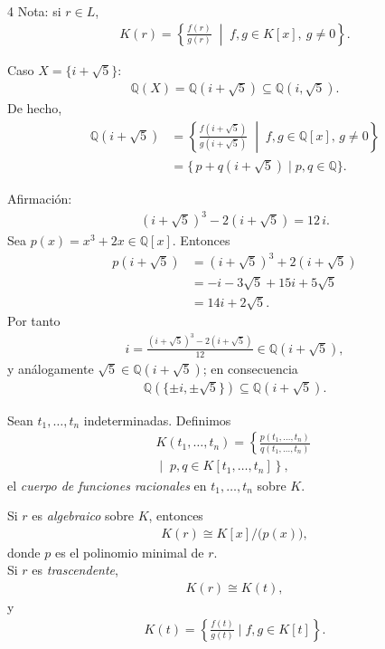 \documentclass[landscape,a4paper]{article}
\begin{document}
\begin{multicols}{4}
Nota: si $r\in L$,
\begin{align*}
  K(r)=\left\{\frac{f(r)}{g(r)} \;\middle|\; f,g\in K[x],\ g\neq 0\right\}.
\end{align*}

Caso $X=\{i+\sqrt{5}\}$:
\begin{align*}
\mathbb{Q}(X)=\mathbb{Q}(i+\sqrt{5})\subseteq\mathbb{Q}(i,\sqrt{5}).
\end{align*}
De hecho,
\begin{align*}
\mathbb{Q}(i+\sqrt{5})&=\left\{\frac{f(i+\sqrt{5})}{g(i+\sqrt{5})}\;\middle|\;f,g\in\mathbb{Q}[x],\,g\neq 0\right\}\\
                      &=\{\,p+q(i+\sqrt{5})\mid p,q\in\mathbb{Q}\}.
\end{align*}

Afirmación:
\begin{align*}
  (i+\sqrt{5})^{3}-2(i+\sqrt{5})=12\,i.
\end{align*}
Sea \(p(x)=x^{3}+2x\in\mathbb{Q}[x]\).  Entonces
\begin{align*}
  p(i+\sqrt{5})&=(i+\sqrt{5})^{3}+2(i+\sqrt{5})\\
               &=-i-3\sqrt{5}+15i+5\sqrt{5}\\
               &=14i+2\sqrt{5}.
\end{align*}
Por tanto
\begin{align*}
 i=\frac{(i+\sqrt{5})^{3}-2(i+\sqrt{5})}{12}\in\mathbb{Q}(i+\sqrt{5}),
\end{align*}
y análogamente \(\sqrt{5}\in\mathbb{Q}(i+\sqrt{5})\); en consecuencia
\begin{align*}
  \mathbb Q(\{\pm i,\pm\sqrt{5}\})\subseteq\mathbb{Q}(i+\sqrt{5}).
\end{align*}
\begin{tcolorbox}[colback=white,colframe=blue!80!black,colbacktitle=blue!80!black,
                  coltitle=white,title={Definición}]
Sean $t_1,\dots,t_n$ indeterminadas. Definimos
\begin{align*}
  K(t_1,\dots,t_n)=\left\{\frac{p(t_1,\dots,t_n)}{q(t_1,\dots,t_n)}\;\right.\\
  \left.\middle|\;p,q\in K[t_1,\dots,t_n]\right\},
\end{align*}
el \emph{cuerpo de funciones racionales} en $t_1,\dots,t_n$ sobre $K$.
\end{tcolorbox}

Si \(r\) es \emph{algebraico} sobre $K$, entonces
\begin{align*}
  K(r)\cong K[x]\big/\bigl(p(x)\bigr),
\end{align*}
donde \(p\) es el polinomio minimal de \(r\).\\
Si \(r\) es \emph{trascendente},
\begin{align*}
  K(r)\cong K(t),
\end{align*}
y
\begin{align*}
  K(t)=\left\{\frac{f(t)}{g(t)}\mid f,g\in K[t]\right\}.
\end{align*}


\end{multicols}
\end{document}
